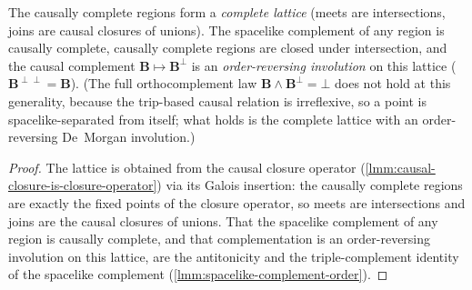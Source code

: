 \begin{theorem}
    \label{thrm:causally-complete-lattice}
    \leanok
    The causally complete regions form a \emph{complete lattice} (meets are intersections, joins are causal closures of unions). The spacelike complement of any region is causally complete, causally complete regions are closed under intersection, and the causal complement $\mathbf{B} \mapsto \mathbf{B}^\perp$ is an \emph{order-reversing involution} on this lattice ($\mathbf{B}^{\perp\perp} = \mathbf{B}$). (The full orthocomplement law $\mathbf{B} \wedge \mathbf{B}^\perp = \bot$ does not hold at this generality, because the trip-based causal relation is irreflexive, so a point is spacelike-separated from itself; what holds is the complete lattice with an order-reversing De~Morgan involution.)
\end{theorem}
\begin{proof}
    \leanok
    The lattice is obtained from the causal closure operator (\ref{lmm:causal-closure-is-closure-operator}) via its Galois insertion: the causally complete regions are exactly the fixed points of the closure operator, so meets are intersections and joins are the causal closures of unions. That the spacelike complement of any region is causally complete, and that complementation is an order-reversing involution on this lattice, are the antitonicity and the triple-complement identity of the spacelike complement (\ref{lmm:spacelike-complement-order}).
\end{proof}

